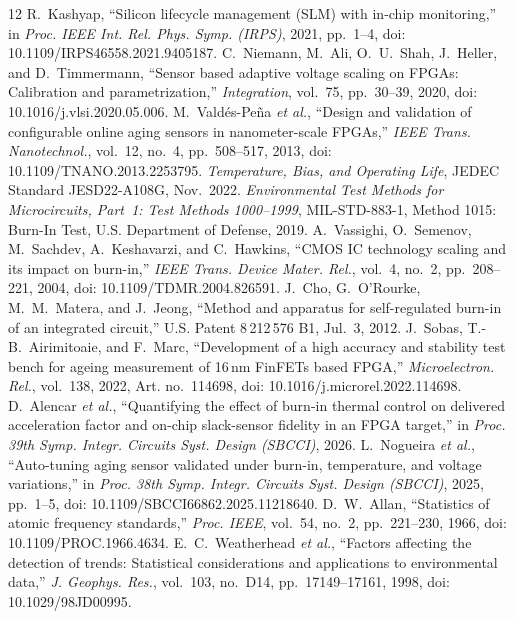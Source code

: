 \documentclass[10pt,twocolumn]{article}
\begin{document}
\renewcommand{\refname}{References}\begin{thebibliography}{12}
\footnotesize
{} R.~Kashyap, ``Silicon lifecycle management (SLM) with in-chip monitoring,'' in \emph{Proc. IEEE Int. Rel. Phys. Symp. (IRPS)}, 2021, pp.~1--4, doi: 10.1109/IRPS46558.2021.9405187.
 C.~Niemann, M.~Ali, O.~U.~Shah, J.~Heller, and D.~Timmermann, ``Sensor based adaptive voltage scaling on FPGAs: Calibration and parametrization,'' \emph{Integration}, vol.~75, pp.~30--39, 2020, doi: 10.1016/j.vlsi.2020.05.006.
 M.~Vald\'es-Pe\~na \emph{et al.}, ``Design and validation of configurable online aging sensors in nanometer-scale FPGAs,'' \emph{IEEE Trans. Nanotechnol.}, vol.~12, no.~4, pp.~508--517, 2013, doi: 10.1109/TNANO.2013.2253795.
 \emph{Temperature, Bias, and Operating Life}, JEDEC Standard JESD22-A108G, Nov.~2022.
 \emph{Environmental Test Methods for Microcircuits, Part~1: Test Methods 1000--1999}, MIL-STD-883-1, Method 1015: Burn-In Test, U.S. Department of Defense, 2019.
 A.~Vassighi, O.~Semenov, M.~Sachdev, A.~Keshavarzi, and C.~Hawkins, ``CMOS IC technology scaling and its impact on burn-in,'' \emph{IEEE Trans. Device Mater. Rel.}, vol.~4, no.~2, pp.~208--221, 2004, doi: 10.1109/TDMR.2004.826591.
 J.~Cho, G.~O'Rourke, M.~M.~Matera, and J.~Jeong, ``Method and apparatus for self-regulated burn-in of an integrated circuit,'' U.S. Patent 8\,212\,576 B1, Jul.~3, 2012.
 J.~Sobas, T.-B.~Airimitoaie, and F.~Marc, ``Development of a high accuracy and stability test bench for ageing measurement of 16\,nm FinFETs based FPGA,'' \emph{Microelectron. Rel.}, vol.~138, 2022, Art. no.~114698, doi: 10.1016/j.microrel.2022.114698.
 D.~Alencar \emph{et al.}, ``Quantifying the effect of burn-in thermal control on delivered acceleration factor and on-chip slack-sensor fidelity in an FPGA target,'' in \emph{Proc. 39th Symp. Integr. Circuits Syst. Design (SBCCI)}, 2026.
 L.~Nogueira \emph{et al.}, ``Auto-tuning aging sensor validated under burn-in, temperature, and voltage variations,'' in \emph{Proc. 38th Symp. Integr. Circuits Syst. Design (SBCCI)}, 2025, pp.~1--5, doi: 10.1109/SBCCI66862.2025.11218640.
 D.~W.~Allan, ``Statistics of atomic frequency standards,'' \emph{Proc. IEEE}, vol.~54, no.~2, pp.~221--230, 1966, doi: 10.1109/PROC.1966.4634.
 E.~C.~Weatherhead \emph{et al.}, ``Factors affecting the detection of trends: Statistical considerations and applications to environmental data,'' \emph{J. Geophys. Res.}, vol.~103, no.~D14, pp.~17149--17161, 1998, doi: 10.1029/98JD00995.
\end{thebibliography}
\end{document}
